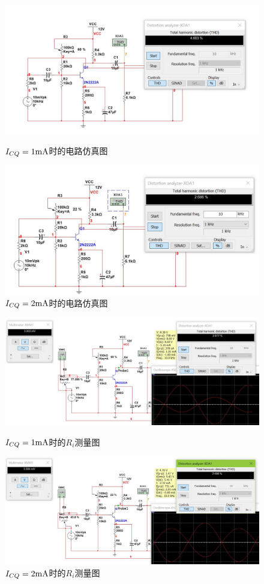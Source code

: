 \documentclass[UTF8,a4paper]{ctexart}
\begin{document}
\begin{figure}
\centering
\includegraphics[width=\textwidth]{TI.JPG}
\caption{$I_{CQ}=1\rm{mA}$时的电路仿真图}
\label{C1}
\includegraphics[width=\textwidth]{TII.JPG}
\caption{$I_{CQ}=2\rm{mA}$时的电路仿真图}
\label{C2}
\end{figure}
\begin{figure}
\centering
\includegraphics[width=\textwidth]{Ri2.JPG}
\caption{$I_{CQ}=1\rm{mA}$时的$R_i$测量图}
\label{Ri1}
\includegraphics[width=\textwidth]{Ri1.JPG}
\caption{$I_{CQ}=2\rm{mA}$时的$R_i$测量图}
\label{Ri2}
\end{figure}
\end{document}
